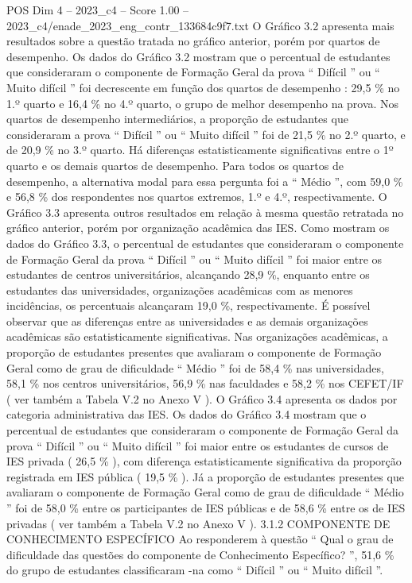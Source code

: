 \begin{textsample}{POS Dim 4 – 2023\_c4 – Score 1.00 – 2023\_c4/enade\_2023\_eng\_contr\_133684c9f7.txt}
O Gráfico 3.2 apresenta mais resultados sobre a questão tratada no gráfico anterior, porém por quartos de desempenho.
Os dados do Gráfico 3.2 mostram que o percentual de estudantes que consideraram o componente de Formação Geral da prova “ Difícil ” ou “ Muito difícil ” foi decrescente em função dos quartos de desempenho : 29,5 \% no 1.º quarto e 16,4 \% no 4.º quarto, o grupo de melhor desempenho na prova.
Nos quartos de desempenho intermediários, a proporção de estudantes que consideraram a prova “ Difícil ” ou “ Muito difícil ” foi de 21,5 \% no 2.º quarto, e de 20,9 \% no 3.º quarto.
Há diferenças estatisticamente significativas entre o 1º quarto e os demais quartos de desempenho.
Para todos os quartos de desempenho, a alternativa modal para essa pergunta foi a “ Médio ”, com 59,0 \% e 56,8 \% dos respondentes nos quartos extremos, 1.º e 4.º, respectivamente.
O Gráfico 3.3 apresenta outros resultados em relação à mesma questão retratada no gráfico anterior, porém por organização acadêmica das IES.
Como mostram os dados do Gráfico 3.3, o percentual de estudantes que consideraram o componente de Formação Geral da prova “ Difícil ” ou “ Muito difícil ” foi maior entre os estudantes de centros universitários, alcançando 28,9 \%, enquanto entre os estudantes das universidades, organizações acadêmicas com as menores incidências, os percentuais alcançaram 19,0 \%, respectivamente.
É possível observar que as diferenças entre as universidades e as demais organizações acadêmicas são estatisticamente significativas.
Nas organizações acadêmicas, a proporção de estudantes presentes que avaliaram o componente de Formação Geral como de grau de dificuldade “ Médio ” foi de 58,4 \% nas universidades, 58,1 \% nos centros universitários, 56,9 \% nas faculdades e 58,2 \% nos CEFET/IF ( ver também a Tabela V.2 no Anexo V ).
O Gráfico 3.4 apresenta os dados por categoria administrativa das IES.
Os dados do Gráfico 3.4 mostram que o percentual de estudantes que consideraram o componente de Formação Geral da prova “ Difícil ” ou “ Muito difícil ” foi maior entre os estudantes de cursos de IES privada ( 26,5 \% ), com diferença estatisticamente significativa da proporção registrada em IES pública ( 19,5 \% ).
Já a proporção de estudantes presentes que avaliaram o componente de Formação Geral como de grau de dificuldade “ Médio ” foi de 58,0 \% entre os participantes de IES públicas e de 58,6 \% entre os de IES privadas ( ver também a Tabela V.2 no Anexo V ). 3.1.2 COMPONENTE DE CONHECIMENTO ESPECÍFICO Ao responderem à questão “ Qual o grau de dificuldade das questões do componente de Conhecimento Específico? ”, 51,6 \% do grupo de estudantes classificaram -na como “ Difícil ” ou “ Muito difícil ”.

\end{textsample}
